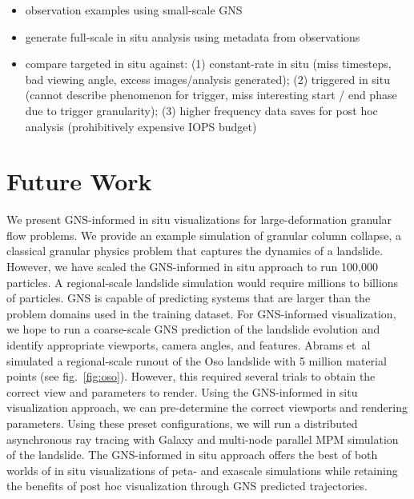\documentclass{vgtc}
\begin{document}
\begin{itemize}
    \item observation examples using small-scale GNS
    \item generate full-scale in situ analysis using metadata from observations
    \item compare targeted in situ against: (1) constant-rate in situ (miss timesteps, bad viewing angle, excess images/analysis generated); (2) triggered in situ (cannot describe phenomenon for trigger, miss interesting start / end phase due to trigger granularity); (3) higher frequency data saves for post hoc analysis (prohibitively expensive IOPS budget)
\end{itemize}

\section{Future Work}
\label{sec:futurework}
We present GNS-informed in situ visualizations for large-deformation granular flow problems. We provide an example simulation of granular column collapse, a classical granular physics problem that captures the dynamics of a landslide. However, we have scaled the GNS-informed in situ approach to run 100,000 particles. A regional-scale landslide simulation would require millions to billions of particles. GNS is capable of predicting systems that are larger than the problem domains used in the training dataset. For GNS-informed visualization, we hope to run a coarse-scale GNS prediction of the landslide evolution and identify appropriate viewports, camera angles, and features. Abrams et~al~\cite{abram22insitu} simulated a regional-scale runout of the Oso landslide with 5 million material points (see fig.~\ref{fig:oso}). However, this required several trials to obtain the correct view and parameters to render. Using the GNS-informed in situ visualization approach, we can pre-determine the correct viewports and rendering parameters. Using these preset configurations, we will run a distributed asynchronous ray tracing with Galaxy and multi-node parallel MPM simulation of the landslide. The GNS-informed in situ approach offers the best of both worlds of in situ visualizations of peta- and exascale simulations while retaining the benefits of post hoc visualization through GNS predicted trajectories.
\end{document}
